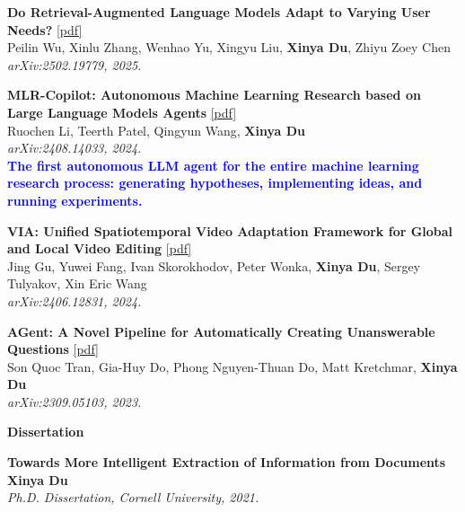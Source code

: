 \begin{enumerate}[{[}1{]},resume,leftmargin=*]
\parbox{\linewidth}{
\item\label{pub:ragneeds}
{\bf Do Retrieval-Augmented Language Models Adapt to Varying User Needs?}
\href{https://arxiv.org/abs/2502.19779}{{{[pdf]}}} \\
Peilin Wu, Xinlu Zhang, Wenhao Yu, Xingyu Liu, \textbf{Xinya Du}, Zhiyu Zoey Chen \\
{\it arXiv:2502.19779, 2025.} \\
}

\parbox{\linewidth}{
\item\label{pub:mlrcopilot}
{\bf MLR-Copilot: Autonomous Machine Learning Research based on Large Language Models Agents}
\href{https://arxiv.org/abs/2408.14033}{{{[pdf]}}} \\
Ruochen Li, Teerth Patel, Qingyun Wang, \textbf{Xinya Du} \\
{\it arXiv:2408.14033, 2024.} \\
{\textcolor{blue}{\textbf{The first autonomous LLM agent for the entire machine learning research process: generating hypotheses, implementing ideas, and running experiments.}}} \\
}

\parbox{\linewidth}{
\item\label{pub:via}
{\bf VIA: Unified Spatiotemporal Video Adaptation Framework for Global and Local Video Editing}
\href{https://arxiv.org/abs/2406.12831}{{{[pdf]}}} \\
Jing Gu, Yuwei Fang, Ivan Skorokhodov, Peter Wonka, \textbf{Xinya Du}, Sergey Tulyakov, Xin Eric Wang \\
{\it arXiv:2406.12831, 2024.} \\
}

\parbox{\linewidth}{
\item\label{pub:agent}
{\bf AGent: A Novel Pipeline for Automatically Creating Unanswerable Questions}
\href{https://arxiv.org/abs/2309.05103}{{{[pdf]}}} \\
Son Quoc Tran, Gia-Huy Do, Phong Nguyen-Thuan Do, Matt Kretchmar, \textbf{Xinya Du} \\
{\it arXiv:2309.05103, 2023.} \\
}

\end{enumerate}

\vspace{1.5mm}
\noindent \textbf{Dissertation}
\begin{enumerate}[{[}1{]},resume,leftmargin=*]

\parbox{\linewidth}{
\item\label{pub:thesis}
{\bf Towards More Intelligent Extraction of Information from Documents} \\
\textbf{Xinya Du} \\
{\it Ph.D. Dissertation, Cornell University, 2021.} \\
}

\end{enumerate}
